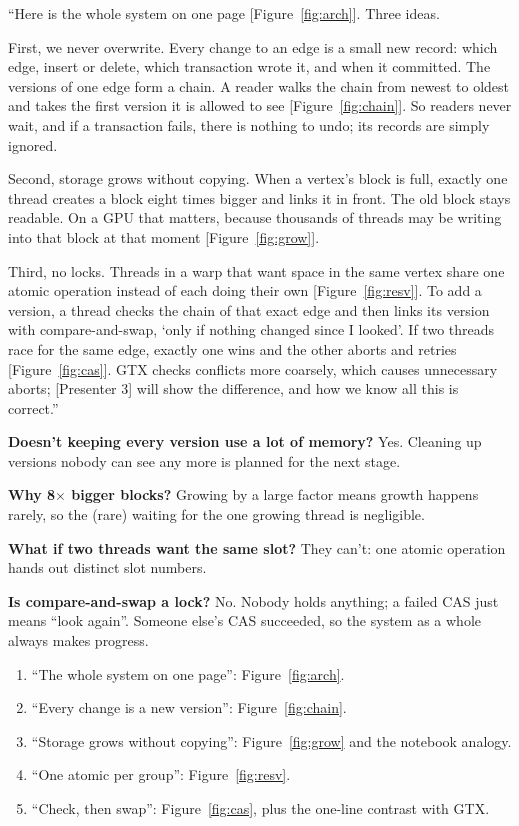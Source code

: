 \documentclass[11pt,a4paper]{article}
\begin{document}
\begin{sayit}
``Here is the whole system on one page [Figure~\ref{fig:arch}]. Three ideas.

First, we never overwrite. Every change to an edge is a small new record: which edge, insert or delete, which
transaction wrote it, and when it committed. The versions of one edge form a chain. A reader walks the chain from
newest to oldest and takes the first version it is allowed to see [Figure~\ref{fig:chain}]. So readers never wait,
and if a transaction fails, there is nothing to undo; its records are simply ignored.

Second, storage grows without copying. When a vertex's block is full, exactly one thread creates a block eight times
bigger and links it in front. The old block stays readable. On a GPU that matters, because thousands of threads may be
writing into that block at that moment [Figure~\ref{fig:grow}].

Third, no locks. Threads in a warp that want space in the same vertex share one atomic operation instead of each doing
their own [Figure~\ref{fig:resv}]. To add a version, a thread checks the chain of that exact edge and then links its
version with compare-and-swap, `only if nothing changed since I looked'. If two threads race for the same edge, exactly
one wins and the other aborts and retries [Figure~\ref{fig:cas}]. GTX checks conflicts more coarsely, which causes
unnecessary aborts; [Presenter 3] will show the difference, and how we know all this is correct.''
\end{sayit}

\begin{askme}
\textbf{Doesn't keeping every version use a lot of memory?} Yes. Cleaning up versions nobody can see any more is
planned for the next stage.

\textbf{Why 8$\times$ bigger blocks?} Growing by a large factor means growth happens rarely, so the (rare) waiting for
the one growing thread is negligible.

\textbf{What if two threads want the same slot?} They can't: one atomic operation hands out distinct slot numbers.

\textbf{Is compare-and-swap a lock?} No. Nobody holds anything; a failed CAS just means ``look again''. Someone else's
CAS succeeded, so the system as a whole always makes progress.
\end{askme}

\begin{slides}
\begin{enumerate}[leftmargin=*]
\item ``The whole system on one page'': Figure~\ref{fig:arch}.
\item ``Every change is a new version'': Figure~\ref{fig:chain}.
\item ``Storage grows without copying'': Figure~\ref{fig:grow} and the notebook analogy.
\item ``One atomic per group'': Figure~\ref{fig:resv}.
\item ``Check, then swap'': Figure~\ref{fig:cas}, plus the one-line contrast with GTX.
\end{enumerate}
\end{slides}
\end{document}
